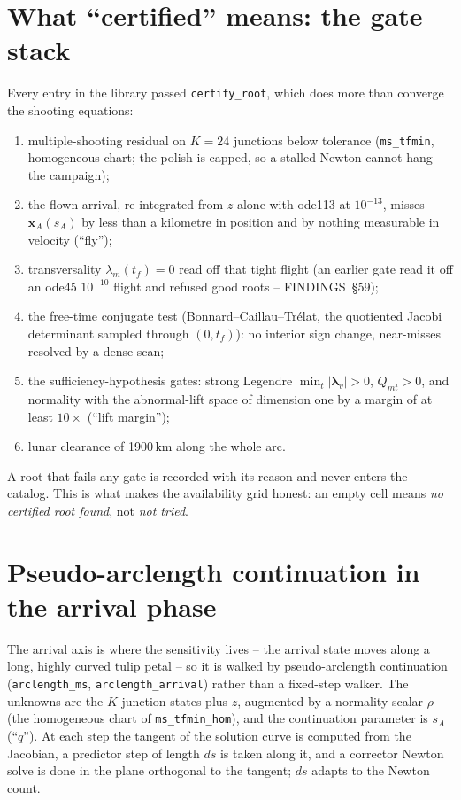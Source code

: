 \documentclass[11pt]{article}
\newcommand{\sA}{s_A}
\newcommand{\tf}{t_f}
\newcommand{\code}[1]{\texttt{#1}}
\begin{document}
\section{What ``certified'' means: the gate stack}

Every entry in the library passed \code{certify\_root}, which does more
than converge the shooting equations:
\begin{enumerate}[nosep]
\item multiple-shooting residual on $K=24$ junctions below tolerance
  (\code{ms\_tfmin}, homogeneous chart; the polish is capped, so a stalled
  Newton cannot hang the campaign);
\item the flown arrival, re-integrated from $z$ alone with ode113 at
  $10^{-13}$, misses $\bm{x}_A(\sA)$ by less than a kilometre in position
  and by nothing measurable in velocity (``fly'');
\item transversality $\lambda_m(\tf)=0$ read off that tight flight (an
  earlier gate read it off an ode45 $10^{-10}$ flight and refused good
  roots -- FINDINGS~\S59);
\item the free-time conjugate test (Bonnard--Caillau--Tr\'elat, the
  quotiented Jacobi determinant sampled through $(0,\tf)$): no interior
  sign change, near-misses resolved by a dense scan;
\item the sufficiency-hypothesis gates: strong Legendre
  $\min_t|\bm{\lambda}_v| > 0$, $Q_{mt} > 0$, and normality with the
  abnormal-lift space of dimension one by a margin of at least $10\times$
  (``lift margin'');
\item lunar clearance of 1900\,km along the whole arc.
\end{enumerate}
A root that fails any gate is recorded with its reason and never enters
the catalog. This is what makes the availability grid honest: an empty
cell means \emph{no certified root found}, not \emph{not tried}.

\section{Pseudo-arclength continuation in the arrival phase}

The arrival axis is where the sensitivity lives -- the arrival state
moves along a long, highly curved tulip petal -- so it is walked by
pseudo-arclength continuation (\code{arclength\_ms},
\code{arclength\_arrival}) rather than a fixed-step walker. The unknowns
are the $K$ junction states plus $z$, augmented by a normality scalar
$\rho$ (the homogeneous chart of \code{ms\_tfmin\_hom}), and the
continuation parameter is $\sA$ (``$q$''). At each step the tangent of the
solution curve is computed from the Jacobian, a predictor step of length
$ds$ is taken along it, and a corrector Newton solve is done in the plane
orthogonal to the tangent; $ds$ adapts to the Newton count.
\end{document}
